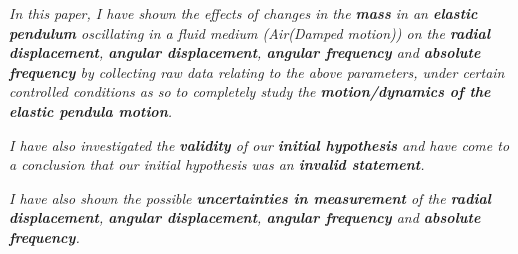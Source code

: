 \textit{In this paper, I have shown the effects of changes in the \textbf{mass} in an \textbf{elastic pendulum} oscillating in a fluid medium (Air(Damped motion)) on the \textbf{radial displacement}, \textbf{angular displacement}, \textbf{angular frequency} and \textbf{absolute frequency} by collecting raw data relating to the above parameters, under certain controlled conditions as so to completely study the \textbf{motion/dynamics of the elastic pendula motion}.}

\textit{I have also investigated the \textbf{validity} of our \textbf{initial hypothesis} and have come to a conclusion that our initial hypothesis was an \textbf{invalid statement}.}

\textit{I have also shown the possible \textbf{uncertainties in measurement} of the \textbf{radial displacement}, \textbf{angular displacement}, \textbf{angular frequency} and \textbf{absolute frequency}.}

